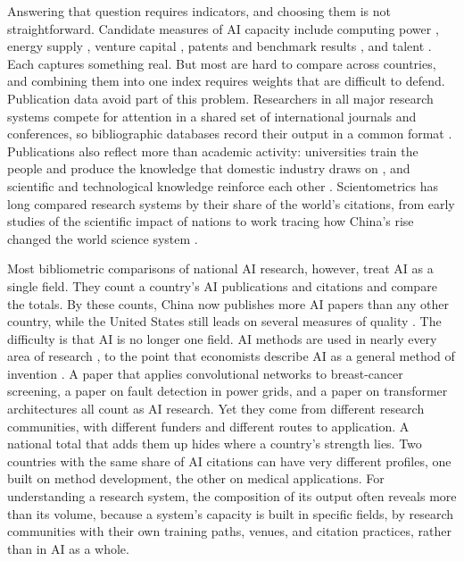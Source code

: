 \documentclass[10pt,twocolumn,a4paper]{article}
\begin{document}
	Answering that question requires indicators, and choosing them is not straightforward. Candidate measures of AI capacity include computing power \parencite{lehdonvirta2024compute}, energy supply \parencite{lin2024exploding}, venture capital \parencite{montanaro2024venture}, patents and benchmark results \parencite{maslej2025artificial}, and talent \parencite{ozkaya2023analysis}. Each captures something real. But most are hard to compare across countries, and combining them into one index requires weights that are difficult to defend. Publication data avoid part of this problem. Researchers in all major research systems compete for attention in a shared set of international journals and conferences, so bibliographic databases record their output in a common format \parencite{machacek2021globalization}. Publications also reflect more than academic activity: universities train the people and produce the knowledge that domestic industry draws on \parencite{brekke2021university}, and scientific and technological knowledge reinforce each other \parencite{szczygielski2024mutual}. Scientometrics has long compared research systems by their share of the world's citations, from early studies of the scientific impact of nations \parencite{may1997scientific,king2004scientific} to work tracing how China's rise changed the world science system \parencite{zhou2006emergence,xie2014china,leydesdorff2014european}.
	
	Most bibliometric comparisons of national AI research, however, treat AI as a single field. They count a country's AI publications and citations and compare the totals. By these counts, China now publishes more AI papers than any other country, while the United States still leads on several measures of quality \parencite{almarzouqi2024comparative,min2026has}. The difficulty is that AI is no longer one field. AI methods are used in nearly every area of research \parencite{hajkowicz2023artificial,gao2024quantifying}, to the point that economists describe AI as a general method of invention \parencite{bianchini2022artificial,crafts2021artificial}. A paper that applies convolutional networks to breast-cancer screening, a paper on fault detection in power grids, and a paper on transformer architectures all count as AI research. Yet they come from different research communities, with different funders and different routes to application. A national total that adds them up hides where a country's strength lies. Two countries with the same share of AI citations can have very different profiles, one built on method development, the other on medical applications. For understanding a research system, the composition of its output often reveals more than its volume, because a system’s capacity is built in specific fields, by research communities with their own training paths, venues, and citation practices, rather than in AI as a whole.
	
\end{document}
